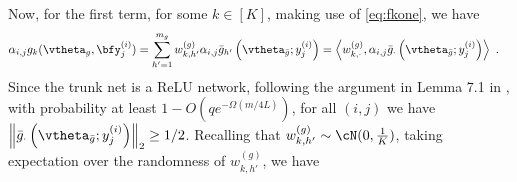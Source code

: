 \proof
Now, for the first term, for some $k \in [K]$, making use of \eqref{eq:fkone}, we have
\begin{align*}
\alpha_{i,j} g_k(\vtheta_g, \bfy_j^{(i)}) & = \sum_{h'=1}^{m_g} w_{k,h'}^{(g)} \alpha_{i,j} \bar{g}_{h'} \left( \vtheta_{\bar{g}} ; y^{(i)}_j \right) = \left\langle w_{k,\cdot}^{(g)} , \alpha_{i,j} \bar{g}_{\cdot} \left( \vtheta_{\bar{g}} ; y^{(i)}_j \right) \right\rangle~.
\end{align*}
Since the trunk net is a ReLU network, following the argument in Lemma 7.1 in \citet{allen-zhu_convergence_2019}, with probability at least $1 - O(q e^{-\Omega(m/4L)})$, for all $(i,j)$ we have $\left\| \bar{g}_{\cdot} \left( \vtheta_{\bar{g}} ; y^{(i)}_j \right) \right\|_2 \geq 1/2$. Recalling that $w_{k,h'}^{(g)} \sim \cN(0, \frac{1}{K})$, taking expectation over the randomness of $w_{k,h'}^{(g)}$, we have 
